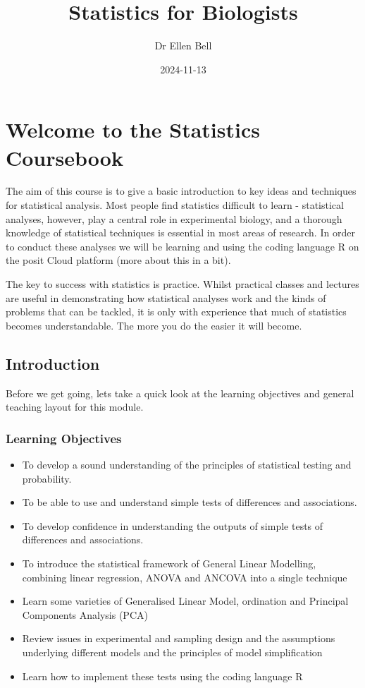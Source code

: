 \documentclass[
]{book}
\title{Statistics for Biologists}
\author{Dr Ellen Bell}
\date{2024-11-13}
\providecommand{\tightlist}{%
  \setlength{\itemsep}{0pt}\setlength{\parskip}{0pt}}
\begin{document}
\maketitle

{
\setcounter{tocdepth}{1}
\tableofcontents
}
\chapter{Welcome to the Statistics Coursebook}\label{c1}

The aim of this course is to give a basic introduction to key ideas and techniques for statistical analysis. Most people find statistics difficult to learn - statistical analyses, however, play a central role in experimental biology, and a thorough knowledge of statistical techniques is essential in most areas of research. In order to conduct these analyses we will be learning and using the coding language R on the posit Cloud platform (more about this in a bit).

The key to success with statistics is practice. Whilst practical classes and lectures are useful in demonstrating how statistical analyses work and the kinds of problems that can be tackled, it is only with experience that much of statistics becomes understandable. The more you do the easier it will become.

\section{Introduction}\label{introduction}

Before we get going, lets take a quick look at the learning objectives and general teaching layout for this module.

\subsection{Learning Objectives}\label{learning-objectives}

\begin{itemize}
\tightlist
\item
  To develop a sound understanding of the principles of statistical testing and probability.
\item
  To be able to use and understand simple tests of differences and associations.
\item
  To develop confidence in understanding the outputs of simple tests of differences and associations.
\item
  To introduce the statistical framework of General Linear Modelling, combining linear regression, ANOVA and ANCOVA into a single technique
\item
  Learn some varieties of Generalised Linear Model, ordination and Principal Components Analysis (PCA)
\item
  Review issues in experimental and sampling design and the assumptions underlying different models and the principles of model simplification
\item
  Learn how to implement these tests using the coding language R
\end{itemize}
\end{document}
